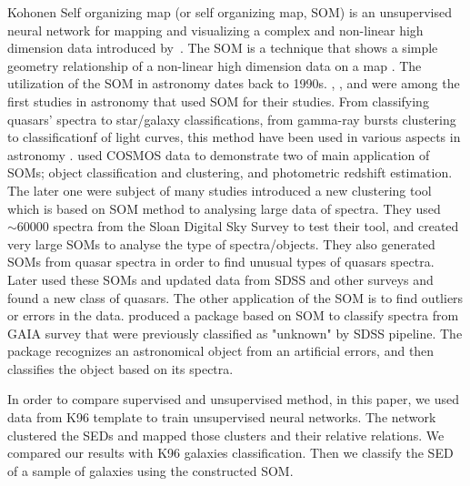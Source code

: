 Kohonen Self organizing map (or self organizing map, SOM) is an unsupervised neural network for mapping and visualizing a complex and non-linear high dimension data introduced by~\citep{Kohonen82}.
The SOM is a technique that shows a simple geometry relationship of a non-linear high dimension data on a map \citep{Kohonen98}.
The utilization of the SOM in astronomy dates back to 1990s. 
\citet[][]{Odewahn92}, \citet[][]{Hernandez94}, and \citet[][]{Murtagh95} were among the first studies in astronomy that used SOM for their studies.
From classifying quasars' spectra to star/galaxy classifications, from gamma-ray bursts clustering to classificationf of light curves, this method have been used in various aspects in astronomy \citep[e.g.][]{Maehoenen95, Miller96,Andreon00,Balastegui01,Rajaniemi02,Brett04,Scaringi09}.
\citet{Geach12} used COSMOS data to demonstrate two of main application of SOMs; object classification and clustering, and photometric redshift estimation. 
The later one were subject of many studies \citep[e.g.][]{Kind14a}
\citet{In12} introduced a new clustering tool which is based on SOM method to analysing large data of spectra.
They used $\sim 60000$ spectra from the Sloan Digital Sky Survey \citep[SDSS;][]{Abazajian09}
to test their tool, and created very large SOMs to analyse the type of spectra/objects.
They also generated SOMs from quasar spectra in order to find unusual types of quasars spectra. Later \citet{Meusinger16} used these SOMs and updated data from SDSS and other surveys and found a new class of quasars.
The other application of the SOM is to find outliers or errors in the data.
\citet{Fustes13} produced a package based on SOM to classify spectra from GAIA survey that were previously classified as "unknown" by SDSS pipeline. The package recognizes an astronomical object from an artificial errors, and then classifies the object based on its spectra.

In order to compare supervised and unsupervised method, in this paper, we used data from K96 template to train unsupervised neural networks. 
The network clustered the SEDs and mapped those clusters and their relative relations.
We compared our results with K96 galaxies classification.
Then we classify the SED of a sample of galaxies using the constructed SOM.
 
